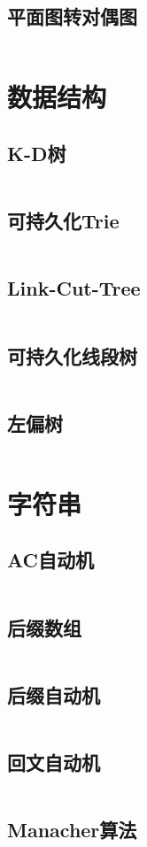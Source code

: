 \documentclass[a4paper]{article}
\newcommand{\cppcode}[1]{
    \inputminted[mathescape,
    			tabsize=2
    			]{cpp}{source/#1}
}
\begin{document}
	\subsection{平面图转对偶图}
		\cppcode{graph/dualgraph.cpp}

\section{数据结构}
	\subsection{K-D树}
		\cppcode{data_structure/KDTree.cpp}

	\subsection{可持久化Trie}
		\cppcode{data_structure/persistant-trie.cpp}

	\subsection{Link-Cut-Tree}
		\cppcode{data_structure/LCT.cpp}

	\subsection{可持久化线段树}
		\cppcode{data_structure/persistant-segtree.cpp}
	
	\subsection{左偏树}
		\cppcode{data_structure/leftist-tree.cpp}

\section{字符串}
	\subsection{AC自动机}
		\cppcode{strings/ACautomaton.cpp}

	\subsection{后缀数组}
		\cppcode{strings/suffixarray.cpp}

	\subsection{后缀自动机}
		\cppcode{strings/SAM.cpp}

	\subsection{回文自动机}
		\cppcode{strings/PAM.cpp}

	\subsection{Manacher算法}
		\cppcode{strings/manacher.cpp}
\end{document}
